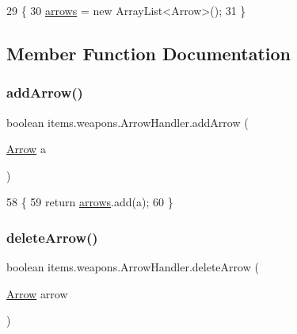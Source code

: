 \begin{DoxyCode}
29                            \{
30         \mbox{\hyperlink{classitems_1_1weapons_1_1_arrow_handler_a7038dd7e7fa3db85bcddf0d8601d4271}{arrows}} = \textcolor{keyword}{new} ArrayList<Arrow>();
31     \}
\end{DoxyCode}


\subsection{Member Function Documentation}
\mbox{\label{classitems_1_1weapons_1_1_arrow_handler_af197702f581022b65e7f0ded40f18758}} 
\subsubsection{\texorpdfstring{add\+Arrow()}{addArrow()}}
{\footnotesize\ttfamily boolean items.\+weapons.\+Arrow\+Handler.\+add\+Arrow (\begin{DoxyParamCaption}\item[{\mbox{\hyperlink{classitems_1_1weapons_1_1_arrow}{Arrow}}}]{a }\end{DoxyParamCaption})\hspace{0.3cm}{\ttfamily [inline]}}


\begin{DoxyCode}
58                                      \{
59         \textcolor{keywordflow}{return} \mbox{\hyperlink{classitems_1_1weapons_1_1_arrow_handler_a7038dd7e7fa3db85bcddf0d8601d4271}{arrows}}.add(a);
60     \}
\end{DoxyCode}
\mbox{\label{classitems_1_1weapons_1_1_arrow_handler_ab7e4dce0dc3cd385a870fe54ca1cabf1}} 
\subsubsection{\texorpdfstring{delete\+Arrow()}{deleteArrow()}}
{\footnotesize\ttfamily boolean items.\+weapons.\+Arrow\+Handler.\+delete\+Arrow (\begin{DoxyParamCaption}\item[{\mbox{\hyperlink{classitems_1_1weapons_1_1_arrow}{Arrow}}}]{arrow }\end{DoxyParamCaption})\hspace{0.3cm}{\ttfamily [inline]}}

